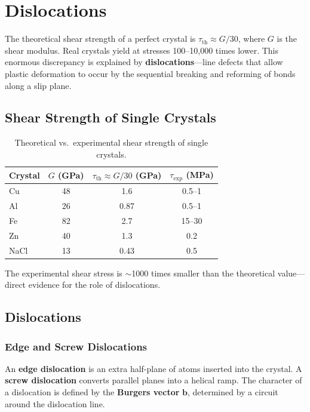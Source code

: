 \chapter{Dislocations}

The theoretical shear strength of a perfect crystal is $\tau_{\text{th}} \approx G/30$, where $G$ is the shear modulus. Real crystals yield at stresses 100--10,000 times lower. This enormous discrepancy is explained by \textbf{dislocations}---line defects that allow plastic deformation to occur by the sequential breaking and reforming of bonds along a slip plane.

\section{Shear Strength of Single Crystals}

\begin{table}[H]
\centering
\caption{Theoretical vs.\ experimental shear strength of single crystals.}
\label{tab:shear}
\begin{tabular}{@{}lSSS@{}}
\toprule
Crystal & {$G$ (\si{\giga\pascal})} & {$\tau_{\text{th}} \approx G/30$ (\si{\giga\pascal})} & {$\tau_{\text{exp}}$ (\si{\mega\pascal})} \\
\midrule
Cu  & 48  & 1.6  & 0.5{--}1 \\
Al  & 26  & 0.87 & 0.5{--}1 \\
Fe  & 82  & 2.7  & 15{--}30 \\
Zn  & 40  & 1.3  & 0.2 \\
NaCl & 13 & 0.43 & 0.5 \\
\bottomrule
\end{tabular}
\end{table}

The experimental shear stress is $\sim$1000 times smaller than the theoretical value---direct evidence for the role of dislocations.

\section{Dislocations}

\subsection{Edge and Screw Dislocations}

An \textbf{edge dislocation} is an extra half-plane of atoms inserted into the crystal. A \textbf{screw dislocation} converts parallel planes into a helical ramp. The character of a dislocation is defined by the \textbf{Burgers vector} $\mathbf{b}$, determined by a circuit around the dislocation line.

